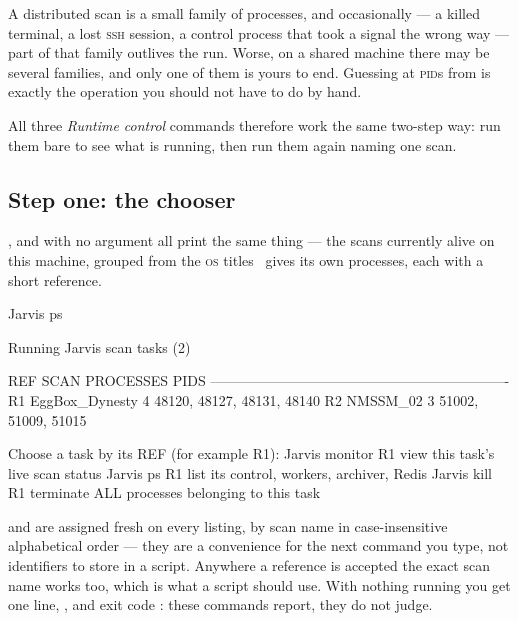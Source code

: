 A distributed scan is a small family of processes, and occasionally --- a killed
terminal, a lost \textsc{ssh} session, a control process that took a signal the wrong
way --- part of that family outlives the run. Worse, on a shared machine there may be
several families, and only one of them is yours to end. Guessing at \textsc{pid}s from
 is exactly the operation you should not have to do by hand.

All three \emph{Runtime control} commands therefore work the same two-step way: run them
bare to see what is running, then run them again naming one scan.

\subsection{Step one: the chooser}

,  and  with no argument all print the same thing --- the
scans currently alive on this machine, grouped from the \textsc{os} titles \Jtwo\ gives
its own processes, each with a short reference.

\begin{terminal}
\begin{jcmd}
Jarvis ps
\end{jcmd}
\termsep
\begin{jout}
Running Jarvis scan tasks (2)

  REF   SCAN             PROCESSES   PIDS
  ----------------------------------------------------------------
  R1    EggBox_Dynesty           4   48120, 48127, 48131, 48140
  R2    NMSSM_02                 3   51002, 51009, 51015

Choose a task by its REF (for example R1):
  Jarvis monitor R1   view this task's live scan status
  Jarvis ps R1        list its control, workers, archiver, Redis
  Jarvis kill R1      terminate ALL processes belonging to this task
\end{jout}
\end{terminal}

 and  are assigned fresh on every listing, by scan name in
case-insensitive alphabetical order --- they are a convenience for the next command you
type, not identifiers to store in a script. Anywhere a reference is accepted the exact
scan name works too, which is what a script should use. With nothing running you get one
line, , and exit code : these commands report,
they do not judge.

